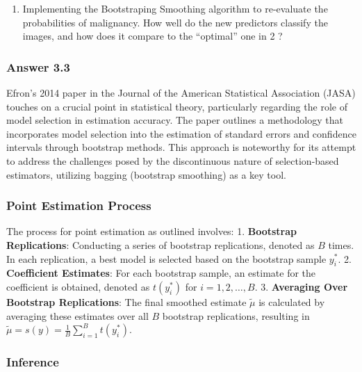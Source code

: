 \documentclass[
]{article}
\providecommand{\tightlist}{%
  \setlength{\itemsep}{0pt}\setlength{\parskip}{0pt}}
\begin{document}
\begin{enumerate}
\def\labelenumi{\arabic{enumi}.}
\setcounter{enumi}{2}
\tightlist
\item
  Implementing the Bootstraping Smoothing algorithm to re-evaluate the
  probabilities of malignancy. How well do the new predictors classify
  the images, and how does it compare to the ``optimal'' one in 2 ?
\end{enumerate}

\hypertarget{answer-3.3}{%
\subsubsection{Answer 3.3}\label{answer-3.3}}

Efron's 2014 paper in the Journal of the American Statistical
Association (JASA) touches on a crucial point in statistical theory,
particularly regarding the role of model selection in estimation
accuracy. The paper outlines a methodology that incorporates model
selection into the estimation of standard errors and confidence
intervals through bootstrap methods. This approach is noteworthy for its
attempt to address the challenges posed by the discontinuous nature of
selection-based estimators, utilizing bagging (bootstrap smoothing) as a
key tool.

\hypertarget{point-estimation-process}{%
\subsubsection{Point Estimation
Process}\label{point-estimation-process}}

The process for point estimation as outlined involves: 1.
\textbf{Bootstrap Replications}: Conducting a series of bootstrap
replications, denoted as \(B\) times. In each replication, a best model
is selected based on the bootstrap sample \(y_i^*\). 2.
\textbf{Coefficient Estimates}: For each bootstrap sample, an estimate
for the coefficient is obtained, denoted as \(t(y_i^*)\) for
\(i=1,2,\dots,B\). 3. \textbf{Averaging Over Bootstrap Replications}:
The final smoothed estimate \(\tilde{\mu}\) is calculated by averaging
these estimates over all \(B\) bootstrap replications, resulting in
\(\tilde{\mu} = s(y) = \frac{1}{B}\sum_{i=1}^B t(y_i^*)\).

\hypertarget{inference}{%
\subsubsection{Inference}\label{inference}}
\end{document}
